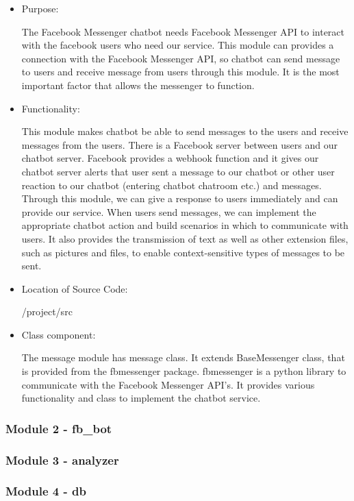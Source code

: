 \begin{itemize}

\item Purpose:

The Facebook Messenger chatbot needs Facebook Messenger API to interact with the facebook users who need our service. This module can provides a connection with the Facebook Messenger API, so chatbot can send message to users and receive message from users through this module. It is the most important factor that allows the messenger to function.  

\item Functionality:

This module makes chatbot be able to send messages to the users and receive messages from the users. There is a Facebook server between users and our chatbot server. Facebook provides a webhook function and it gives our chatbot server alerts that user sent a message to our chatbot or other user reaction to our chatbot (entering chatbot chatroom etc.) and messages. Through this module, we can give a response to users immediately and can provide our service. When users send messages, we can implement the appropriate chatbot action and build scenarios in which to communicate with users. It also provides the transmission of text as well as other extension files, such as pictures and files, to enable context-sensitive types of messages to be sent. 

\item Location of Source Code:

/project/src

\item Class component:

The message module has message class. It extends BaseMessenger class, that is provided from the fbmessenger package. fbmessenger is a python library to communicate with the Facebook Messenger API's. It provides various functionality and class to implement the chatbot service.  

\end{itemize}

\subsubsection{Module 2 - fb\_bot}

\subsubsection{Module 3 - analyzer}

\subsubsection{Module 4 - db}

